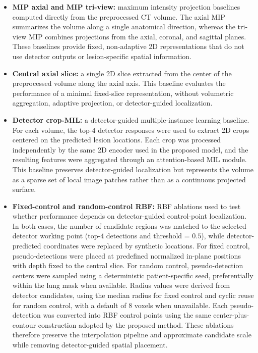 \documentclass[preprint,12pt]{elsarticle}
\begin{document}
\begin{itemize}
    \item \textbf{MIP axial and MIP tri-view:} maximum intensity projection baselines computed directly from the preprocessed CT volume. The axial MIP summarizes the volume along a single anatomical direction, whereas the tri-view MIP combines projections from the axial, coronal, and sagittal planes. These baselines provide fixed, non-adaptive 2D representations that do not use detector outputs or lesion-specific spatial information.

    \item \textbf{Central axial slice:} a single 2D slice extracted from the center of the preprocessed volume along the axial axis. This baseline evaluates the performance of a minimal fixed-slice representation, without volumetric aggregation, adaptive projection, or detector-guided localization.

    \item \textbf{Detector crop-MIL:} a detector-guided multiple-instance learning baseline. For each volume, the top-$4$ detector responses were used to extract 2D crops centered on the predicted lesion locations. Each crop was processed independently by the same 2D encoder used in the proposed model, and the resulting features were aggregated through an attention-based MIL module. This baseline preserves detector-guided localization but represents the volume as a sparse set of local image patches rather than as a continuous projected surface.

    \item \textbf{Fixed-control and random-control RBF:} RBF ablations used to test whether performance depends on detector-guided control-point localization. In both cases, the number of candidate regions was matched to the selected detector working point (top-$4$ detections and threshold = $0.5$), while detector-predicted coordinates were replaced by synthetic locations.
    For fixed control, pseudo-detections were placed at predefined normalized in-plane positions with depth fixed to the central slice. For random control, pseudo-detection centers were sampled using a deterministic patient-specific seed, preferentially within the lung mask when available. Radius values were derived from detector candidates, using the median radius for fixed control and cyclic reuse for random control, with a default of $8$ voxels when unavailable.
    Each pseudo-detection was converted into RBF control points using the same center-plus-contour construction adopted by the proposed method. These ablations therefore preserve the interpolation pipeline and approximate candidate scale while removing detector-guided spatial placement.
    

\end{itemize}
\end{document}

